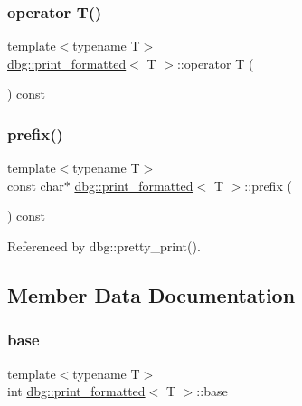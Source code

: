 \subsubsection{\texorpdfstring{operator T()}{operator T()}}
{\footnotesize\ttfamily template$<$typename T$>$ \\
\hyperlink{structdbg_1_1print__formatted}{dbg\+::print\+\_\+formatted}$<$ T $>$\+::operator T (\begin{DoxyParamCaption}{ }\end{DoxyParamCaption}) const\hspace{0.3cm}{\ttfamily [inline]}}

\mbox{\label{structdbg_1_1print__formatted_ab490d37d984d053177b6af3f94d0136e}} 
\subsubsection{\texorpdfstring{prefix()}{prefix()}}
{\footnotesize\ttfamily template$<$typename T$>$ \\
const char$\ast$ \hyperlink{structdbg_1_1print__formatted}{dbg\+::print\+\_\+formatted}$<$ T $>$\+::prefix (\begin{DoxyParamCaption}{ }\end{DoxyParamCaption}) const\hspace{0.3cm}{\ttfamily [inline]}}



Referenced by dbg\+::pretty\+\_\+print().



\subsection{Member Data Documentation}
\mbox{\label{structdbg_1_1print__formatted_af57ecb89743fca9b4cb1d0afd3c9d9f4}} 
\subsubsection{\texorpdfstring{base}{base}}
{\footnotesize\ttfamily template$<$typename T$>$ \\
int \hyperlink{structdbg_1_1print__formatted}{dbg\+::print\+\_\+formatted}$<$ T $>$\+::base}



